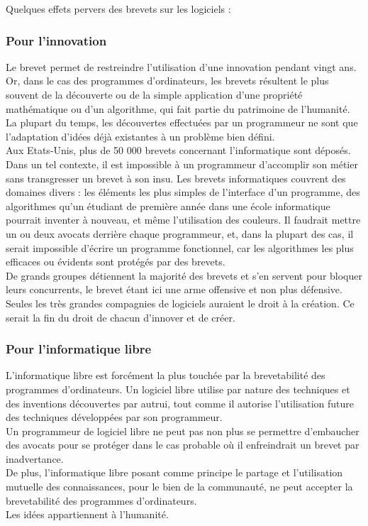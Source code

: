 \documentclass{article}
\begin{document}
Quelques effets pervers des brevets sur les logiciels :

\subsubsection*{Pour l'innovation}
Le brevet permet de restreindre l'utilisation d'une innovation pendant vingt ans. \vspace{5mm} \\
Or, dans le cas des programmes d'ordinateurs, les brevets résultent le plus souvent de la découverte ou de la simple application d'une propriété mathématique ou d'un algorithme, qui fait partie du patrimoine de l'humanité. La plupart du temps, les découvertes effectuées par un programmeur ne sont que l'adaptation d'idées déjà existantes à un problème bien défini. \vspace{5mm} \\
Aux Etats-Unis, plus de 50 000 brevets concernant l'informatique sont déposés. Dans un tel contexte, il est impossible à un programmeur d'accomplir son métier sans transgresser un brevet à son insu. Les brevets informatiques couvrent des domaines divers : les éléments les plus simples de l'interface d'un programme, des algorithmes qu'un étudiant de première année dans une école informatique pourrait inventer à nouveau, et même l'utilisation des couleurs. Il faudrait mettre un ou deux avocats derrière chaque programmeur, et, dans la plupart des cas, il serait impossible d'écrire un programme fonctionnel, car les algorithmes les plus efficaces ou évidents sont protégés par des brevets. \vspace{5mm} \\
De grands groupes détiennent la majorité des brevets et s'en servent pour bloquer leurs concurrents, le brevet étant ici une arme offensive et non plus défensive. Seules les très grandes compagnies de logiciels auraient le droit à la création. Ce serait la fin du droit de chacun d'innover et de créer.

\newpage

\subsubsection*{Pour l'informatique libre}
L'informatique libre est forcément la plus touchée par la brevetabilité des programmes d'ordinateurs. Un logiciel libre utilise par nature des techniques et des inventions découvertes par autrui, tout comme il autorise l'utilisation future des techniques développées par son programmeur. \vspace{5mm} \\
Un programmeur de logiciel libre ne peut pas non plus se permettre d'embaucher des avocats pour se protéger dans le cas probable où il enfreindrait un brevet par inadvertance. \vspace{5mm} \\
De plus, l'informatique libre posant comme principe le partage et l'utilisation mutuelle des connaissances, pour le bien de la communauté, ne peut accepter la brevetabilité des programmes d'ordinateurs. \vspace{5mm} \\
Les idées appartiennent à l'humanité.
\end{document}
